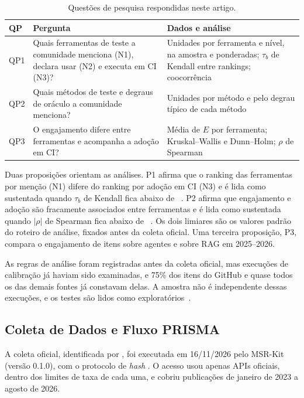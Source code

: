 \documentclass[sigconf]{acmart}
\newcommand{\ColData}{16/11/2026}        %
\newcommand{\ColVersao}{0.1.0}           %
\newcommand{\ColJaVistosGithub}{75}      %
\begin{document}
\begin{table}[htbp]
\centering
\caption{Questões de pesquisa respondidas neste artigo.}
\label{tab:qps}
\footnotesize
\setlength{\tabcolsep}{4pt}
\begin{tabular}{@{}p{0.7cm}p{3.6cm}p{3.5cm}@{}}
\toprule
\textbf{QP} & \textbf{Pergunta} & \textbf{Dados e análise} \\
\midrule
QP1 & Quais ferramentas de teste a comunidade menciona (N1), declara usar (N2) e executa em CI (N3)? & Unidades por ferramenta e nível, na amostra e ponderadas; $\tau_b$ de Kendall entre rankings; coocorrência \\
QP2 & Quais métodos de teste e degraus de oráculo a comunidade menciona? & Unidades por método e pelo degrau típico de cada método \\
QP3 & O engajamento difere entre ferramentas e acompanha a adoção em CI? & Média de $E$ por ferramenta; Kruskal--Wallis e Dunn--Holm; $\rho$ de Spearman \\
\bottomrule
\end{tabular}
\end{table}

Duas proposições orientam as análises. P1 afirma que o ranking das ferramentas por menção (N1) difere do ranking por adoção em CI (N3) e é lida como sustentada quando $\tau_b$ de Kendall fica abaixo de \ResLimiarTau~\cite{kendall1938,borges2018star}. P2 afirma que engajamento e adoção são fracamente associados entre ferramentas e é lida como sustentada quando $|\rho|$ de Spearman fica abaixo de \ResLimiarRho~\cite{kalliamvakou2014promises}. Os dois limiares são os valores padrão do roteiro de análise, fixados antes da coleta oficial. Uma terceira proposição, P3, compara o engajamento de itens sobre agentes e sobre RAG em 2025--2026.

As regras de análise foram registradas antes da coleta oficial, mas execuções de calibração já haviam sido examinadas, e \ColJaVistosGithub\% dos itens do GitHub e quase todos os das demais fontes já constavam delas. A amostra não é independente dessas execuções, e os testes são lidos como exploratórios~\cite{ralph2020standards}.

\subsection{Coleta de Dados e Fluxo PRISMA}
\label{sec:met-coleta}

A coleta oficial, identificada por \texttt{\ResRunId}, foi executada em \ColData{} pelo MSR-Kit~\cite{msrkit2027} (versão \ColVersao), com o protocolo de \textit{hash} \ResProtocoloSha. O acesso usou apenas APIs oficiais, dentro dos limites de taxa de cada uma, e cobriu publicações de janeiro de 2023 a agosto de 2026.
\end{document}
